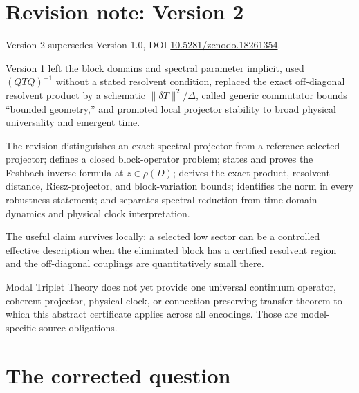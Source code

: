 \documentclass[11pt]{article}
\theoremstyle{definition}
\theoremstyle{remark}
\newcommand{\1}{\mathbf 1}
\newcommand{\MTT}{Modal Triplet Theory}
\begin{document}
\section*{Revision note: Version 2}
\begin{description}[leftmargin=2.5cm,style=nextline]
\item[Supersedes]
Version 2 supersedes Version 1.0, DOI
\href{https://doi.org/10.5281/zenodo.18261354}
{10.5281/zenodo.18261354}.

\item[Reason]
Version 1 left the block domains and spectral parameter implicit, used
\((QTQ)^{-1}\) without a stated resolvent condition, replaced the exact
off-diagonal resolvent product by a schematic
\(\|\delta T\|^2/\Delta\), called generic commutator bounds ``bounded
geometry,'' and promoted local projector stability to broad physical
universality and emergent time.

\item[Resolution]
The revision distinguishes an exact spectral projector from a
reference-selected projector; defines a closed block-operator problem;
states and proves the Feshbach inverse formula at \(z\in\rho(D)\); derives
the exact product, resolvent-distance, Riesz-projector, and block-variation
bounds; identifies the norm in every robustness statement; and separates
spectral reduction from time-domain dynamics and physical clock
interpretation.

\item[Retained content]
The useful claim survives locally: a selected low sector can be a
controlled effective description when the eliminated block has a
certified resolvent region and the off-diagonal couplings are quantitatively
small there.

\item[Remaining boundary]
\MTT{} does not yet provide one universal continuum operator, coherent
projector, physical clock, or connection-preserving transfer theorem to
which this abstract certificate applies across all encodings.  Those are
model-specific source obligations.
\end{description}

\tableofcontents

\section{The corrected question}
\label{sec:intro}
\end{document}
